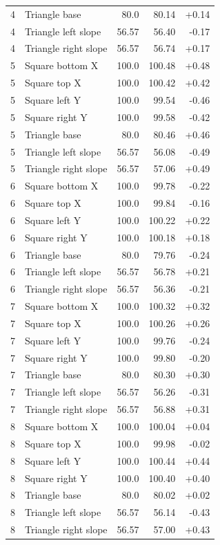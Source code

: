 \begin{longtable}{rlrrr}
4 & Triangle base & 80.0 & 80.14 & +0.14\\
4 & Triangle left slope & 56.57 & 56.40 & -0.17\\
4 & Triangle right slope & 56.57 & 56.74 & +0.17\\
5 & Square bottom X & 100.0 & 100.48 & +0.48\\
5 & Square top X & 100.0 & 100.42 & +0.42\\
5 & Square left Y & 100.0 & 99.54 & -0.46\\
5 & Square right Y & 100.0 & 99.58 & -0.42\\
5 & Triangle base & 80.0 & 80.46 & +0.46\\
5 & Triangle left slope & 56.57 & 56.08 & -0.49\\
5 & Triangle right slope & 56.57 & 57.06 & +0.49\\
6 & Square bottom X & 100.0 & 99.78 & -0.22\\
6 & Square top X & 100.0 & 99.84 & -0.16\\
6 & Square left Y & 100.0 & 100.22 & +0.22\\
6 & Square right Y & 100.0 & 100.18 & +0.18\\
6 & Triangle base & 80.0 & 79.76 & -0.24\\
6 & Triangle left slope & 56.57 & 56.78 & +0.21\\
6 & Triangle right slope & 56.57 & 56.36 & -0.21\\
7 & Square bottom X & 100.0 & 100.32 & +0.32\\
7 & Square top X & 100.0 & 100.26 & +0.26\\
7 & Square left Y & 100.0 & 99.76 & -0.24\\
7 & Square right Y & 100.0 & 99.80 & -0.20\\
7 & Triangle base & 80.0 & 80.30 & +0.30\\
7 & Triangle left slope & 56.57 & 56.26 & -0.31\\
7 & Triangle right slope & 56.57 & 56.88 & +0.31\\
8 & Square bottom X & 100.0 & 100.04 & +0.04\\
8 & Square top X & 100.0 & 99.98 & -0.02\\
8 & Square left Y & 100.0 & 100.44 & +0.44\\
8 & Square right Y & 100.0 & 100.40 & +0.40\\
8 & Triangle base & 80.0 & 80.02 & +0.02\\
8 & Triangle left slope & 56.57 & 56.14 & -0.43\\
8 & Triangle right slope & 56.57 & 57.00 & +0.43\\

\end{longtable}
